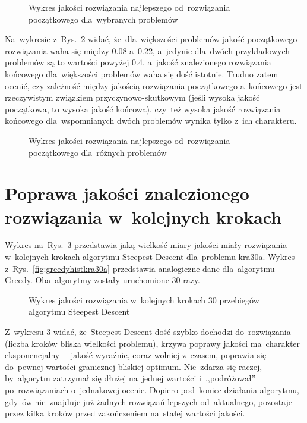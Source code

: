 \documentclass[a4paper,10pt]{article}
\begin{document}
\begin{figure}
\begin{center}

\caption{Wykres jakości rozwiązania najlepszego od~rozwiązania początkowego dla~wybranych problemów}
\label{fig:initendquality}
\end{center}
\end{figure}

Na~wykresie z~Rys.~\ref{fig:initendqualityall} widać, że~dla~większości
problemów jakość początkowego rozwiązania waha się między \num{0.08} a~\num{0.22}, a~jedynie dla~dwóch przykładowych problemów
są to wartości powyżej \num{0.4}, a~jakość znalezionego rozwiązania końcowego dla~większości problemów waha się dość istotnie.
Trudno zatem ocenić, czy zależność między jakością rozwiązania początkowego a~końcowego jest rzeczywistym związkiem przyczynowo-skutkowym
(jeśli wysoka jakość początkowa, to wysoka jakość końcowa), czy~też wysoka jakość rozwiązania końcowego dla~wspomnianych dwóch problemów
wynika tylko z~ich charakteru.

\begin{figure}[!htpb]
\begin{center}

\caption{Wykres jakości rozwiązania najlepszego od~rozwiązania początkowego dla~różnych problemów}
\label{fig:initendqualityall}
\end{center}
\end{figure}

\section{Poprawa jakości znalezionego rozwiązania w~kolejnych krokach}
Wykres na~Rys.~\ref{fig:steephistkra30a} przedstawia jaką wielkość miary jakości miały rozwiązania w~kolejnych krokach
algorytmu Steepest Descent dla~problemu kra30a. Wykres z~Rys.~\ref{fig:greedyhistkra30a} przedstawia analogiczne dane
dla~algorytmu Greedy. Oba~algorytmy zostały uruchomione 30 razy.

\begin{figure}[!htpb]
\begin{center}

\caption{Wykres jakości rozwiązania w~kolejnych krokach 30 przebiegów algorytmu Steepest Descent}
\label{fig:steephistkra30a}
\end{center}
\end{figure}

Z~wykresu \ref{fig:steephistkra30a} widać, że~Steepest Descent dość szybko dochodzi do~rozwiązania (liczba kroków bliska wielkości problemu),
krzywa poprawy jakości ma~charakter eksponencjalny~-- jakość wyraźnie, coraz wolniej z~czasem,
poprawia się do~pewnej wartości granicznej bliskiej optimum. Nie~zdarza się raczej, by~algorytm zatrzymał się dłużej
na~jednej wartości i~,,podróżował'' po~rozwiązaniach o~jednakowej ocenie. Dopiero pod~koniec działania algorytmu, gdy~ów
nie~znajduje już żadnych rozwiązań lepszych od~aktualnego, pozostaje przez kilka kroków przed zakończeniem na~stałej
wartości jakości.
\end{document}
